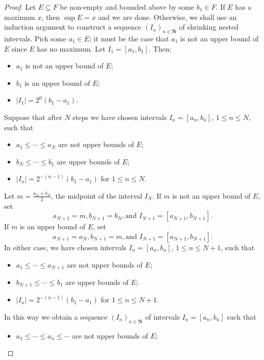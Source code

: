 \documentclass[12pt]{article}
\theoremstyle{definition}
\newcommand{\N}{\mathbf{N}}
\begin{document}
\begin{proof}
    Let \( E \subseteq F \) be non-empty and bounded above by some \( b_1 \in F \). If \( E \) has a maximum \( x \), then \( \sup E = x \) and we are done. Otherwise, we shall use an induction argument to construct a sequence \( (I_n)_{n \in \N} \) of shrinking nested intervals. Pick some \( a_1 \in E \); it must be the case that \( a_1 \) is not an upper bound of \( E \) since \( E \) has no maximum. Let \( I_1 = [a_1, b_1] \). Then:
    \begin{itemize}
        \item \( a_1 \) is not an upper bound of \( E \);
        \item \( b_1 \) is an upper bound of \( E \);
        \item \( |I_1| = 2^0 (b_1 - a_1) \).
    \end{itemize}
    Suppose that after \( N \) steps we have chosen intervals \( I_n = [a_n, b_n] \), \( 1 \leq n \leq N \), such that
    \begin{itemize}
        \item \( a_1 \leq \cdots \leq a_N \) are not upper bounds of \( E \);
        \item \( b_N \leq \cdots \leq b_1 \) are upper bounds of \( E \);
        \item \( |I_n| = 2^{-(n-1)}(b_1 - a_1) \) for \( 1 \leq n \leq N \).
    \end{itemize}
    Let \( m = \tfrac{a_N + b_N}{2} \), the midpoint of the interval \( I_N \). If \( m \) is not an upper bound of \( E \), set
    \[
        a_{N+1} = m, b_{N+1} = b_N, \text{and } I_{N+1} = [a_{N+1}, b_{N+1}].
    \]
    If \( m \) is an upper bound of \( E \), set
    \[
        a_{N+1} = a_N, b_{N+1} = m, \text{and } I_{N+1} = [a_{N+1}, b_{N+1}].
    \]
    In either case, we have chosen intervals \( I_n = [a_n, b_n] \), \( 1 \leq n \leq N + 1 \), such that
    \begin{itemize}
        \item \( a_1 \leq \cdots \leq a_{N+1} \) are not upper bounds of \( E \);
        \item \( b_{N+1} \leq \cdots \leq b_1 \) are upper bounds of \( E \);
        \item \( |I_n| = 2^{-(n-1)}(b_1 - a_1) \) for \( 1 \leq n \leq N + 1 \).
    \end{itemize}
    In this way we obtain a sequence \( (I_n)_{n \in \N} \) of intervals \( I_n = [a_n, b_n] \) such that
    \begin{itemize}
        \item \( a_1 \leq \cdots \leq a_n \leq \cdots \) are not upper bounds of \( E \);

\end{itemize}
\end{proof}
\end{document}
